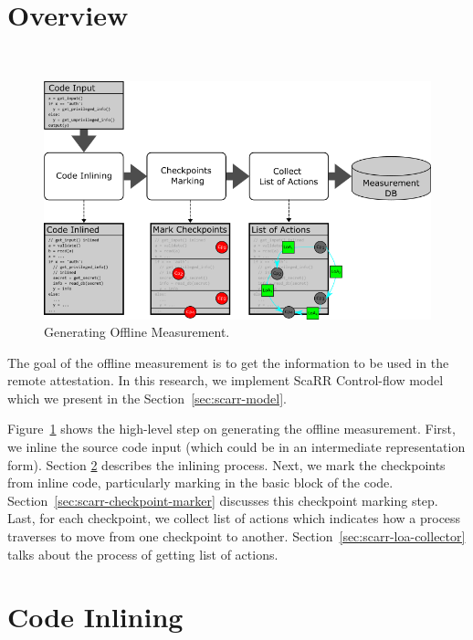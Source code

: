\section{Overview}\
\label{sec:overview}

\begin{figure}[t]
    \centerline{\includegraphics[scale=.75]{Figures/04/scarr-overview.png}}
    \caption{Generating Offline Measurement.}
    \label{fig:scarr-overview}
\end{figure}

The goal of the offline measurement is to get the information to be used in the
remote attestation. In this research, we implement ScaRR Control-flow
model~\cite{toffaliniScaRRScalableRuntime2019} which we present in the
Section~\ref{sec:scarr-model}. 

Figure~\ref{fig:scarr-overview} shows the high-level step on generating the
offline measurement. First, we inline the source code input (which could be in
an intermediate representation form). Section \ref{sec:code-inlining} describes
the inlining process. Next, we mark the checkpoints from inline code,
particularly marking in the basic block of the code.
Section~\ref{sec:scarr-checkpoint-marker} discusses this checkpoint marking
step. Last, for each checkpoint, we collect list of actions which indicates how
a process traverses to move from one checkpoint to another.
Section~\ref{sec:scarr-loa-collector} talks about the process of getting list of
actions.

\section{Code Inlining}
\label{sec:code-inlining}


